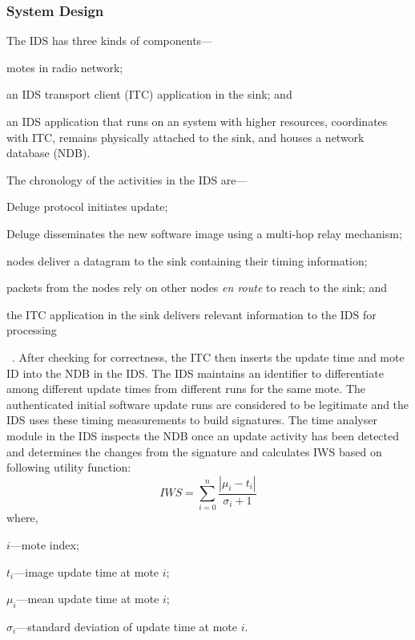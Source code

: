 \documentclass{CRPITStyle}
\renewcommand{\cite}{\citep}
\begin{document}
\subsubsection*{System Design}
The IDS has three kinds of components---%
\begin{inparaenum}
\item motes in radio network; 
\item an IDS transport client (ITC) application in the sink; and
\item an IDS application that runs on an system with higher resources, coordinates with ITC, remains physically attached to the sink, and houses a network database (NDB).
\end{inparaenum}
The chronology of the activities in the IDS are---%
\begin{inparaenum}
\item Deluge protocol initiates update;
\item Deluge disseminates the new software image using a multi-hop relay mechanism; 
\item nodes deliver a datagram to the sink containing their timing information;
\item packets from the nodes rely on other nodes \emph{en route} to reach to the sink; and
\item the ITC application in the sink delivers relevant information to the IDS for processing 
\end{inparaenum}~\cite{tep116}.
After checking for correctness, the ITC then inserts the update time and mote ID into the NDB in the IDS.
The IDS maintains an identifier to differentiate among different update times from different runs for the same mote.
The authenticated initial software update runs are considered to be legitimate and the IDS uses these timing measurements to build signatures.
The time analyser module in the IDS inspects the NDB once an update activity has been detected and determines the changes from the signature and calculates IWS based on following utility function:
\begin{equation}
\label{eqn2} 
	\mathit{IWS} = \sum \limits_{i=0}^{n} \frac{\left| \mu_i - t_i \right|}{\sigma_i + 1}
\end{equation}
where, 
\begin{inparaenum}
\item $\mathit{i}$---mote index; %
\item $\mathit{t_i}$---image update time at mote $\mathit{i}$;  
\item $\mathit{\mu_i}$---mean update time at mote $\mathit{i}$;  
\item $\mathit{\sigma_i}$---standard deviation of update time at mote $\mathit{i}$. 
\end{inparaenum}	
\end{document}
